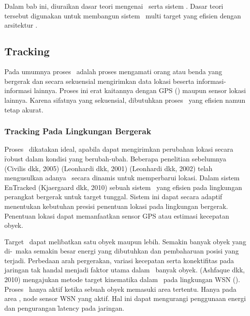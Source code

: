 
\chapter{\babDua}

Dalam bab ini, diuraikan dasar teori mengenai \tracking~serta sistem \pubsub.
Dasar teori tersebut digunakan untuk membangun sistem \tracking~multi target
yang efisien dengan arsitektur \pubsub.

\section{\f{Tracking}}

Pada umumnya proses \tracking~adalah proses mengamati orang atau benda yang
bergerak dan secara sekuensial mengirimkan data lokasi beserta
informasi-informasi lainnya.  Proses ini erat kaitannya dengan GPS (\GPS)
maupun sensor lokasi lainnya. Karena sifatnya yang sekuensial, dibutuhkan
proses \tracking~yang efisien namun tetap akurat.

\subsection{\f{Tracking} Pada Lingkungan Bergerak}

Proses \tracking~dikatakan ideal, apabila dapat mengirimkan perubahan lokasi
secara \f{robust} dalam kondisi yang berubah-ubah. Beberapa penelitian sebelumnya
(Civilis dkk, 2005) (Leonhardi dkk, 2001) (Leonhardi dkk, 2002) telah mengusulkan
adanya \tracking~secara dinamis untuk memperbarui lokasi. Dalam sistem EnTracked
(Kjaergaard dkk, 2010) sebuah sistem \tracking~yang efisien pada lingkungan
perangkat bergerak untuk target tunggal. Sistem ini dapat secara adaptif
menentukan kebutuhan presisi penentuan lokasi pada lingkungan bergerak. Penentuan
lokasi dapat memanfaatkan sensor GPS atau estimasi kecepatan obyek.

Target \tracking~dapat melibatkan satu obyek maupun lebih. Semakin banyak obyek
yang di-\tracking~maka semakin besar energi yang dibutuhkan dan pembaharuan
posisi yang terjadi. Perbedaan arah pergerakan, variasi kecepatan serta
konektifitas pada jaringan tak handal menjadi faktor utama dalam
\tracking~banyak obyek. (Ashfaque dkk, 2010) mengajukan metode
target kinematika dalam \tracking~pada lingkungan WSN (\wsn). Proses
\tracking~hanya aktif ketika sebuah obyek memasuki area tertentu.  Hanya pada
area \tracking, node sensor WSN yang aktif. Hal ini dapat mengurangi penggunaan
energi dan pengurangan \f{latency} pada jaringan.

